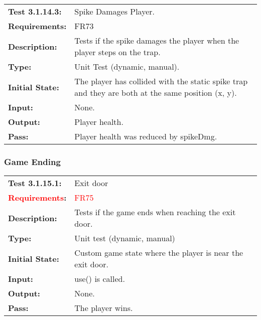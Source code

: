 \documentclass[12pt, titlepage]{article}
\begin{document}
\begin{tabular}{|l|p{10cm}|}
    \hline
    \bf{Test} 3.1.14.3: & Spike Damages Player.\\
    \bf{Requirements}: & FR73\\
    \bf{Description}: & Tests if the spike damages the player when the player steps on the trap. \\
    \bf{Type}: & Unit Test (dynamic, manual). \\
    \bf{Initial State}: & The player has collided with the static spike trap and they are both at the same position (x, y). \\
    \bf{Input}: & None.\\
    \bf{Output}: & Player health.\\
    \bf{Pass}: & Player health was reduced by spikeDmg.\\
    \hline
\end{tabular}

\subsubsection{Game Ending}

\begin{tabular}{|l|p{10cm}|}
    \hline
    \bf{Test} 3.1.15.1: & Exit door \\
    \bf{\textcolor{red}{Requirements}}: & \textcolor{red}{FR75}\\
    \bf{Description}: & Tests if the game ends when reaching the exit door. \\
    \bf{Type}: & Unit test (dynamic, manual) \\
    \bf{Initial State}: & Custom game state where the player is near the exit door. \\
    \bf{Input}: & use() is called. \\
    \bf{Output}: & None. \\
    \bf{Pass}: & The player wins. \\
    \hline
\end{tabular}

\end{document}
